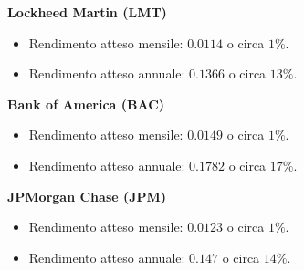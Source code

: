 \textbf{Lockheed Martin (LMT)}

\begin{itemize}
    \item Rendimento atteso mensile: $0.0114$ o circa $1\%$.
    \item Rendimento atteso annuale: $0.1366$ o circa $13\%$.
\end{itemize}

\textbf{Bank of America (BAC)}

\begin{itemize}
    \item Rendimento atteso mensile: $0.0149$ o circa $1\%$.
    \item Rendimento atteso annuale: $0.1782$ o circa $17\%$.
\end{itemize}

\textbf{JPMorgan Chase (JPM)}

\begin{itemize}
    \item Rendimento atteso mensile: $0.0123$ o circa $1\%$.
    \item Rendimento atteso annuale: $0.147$ o circa $14\%$.
\end{itemize}